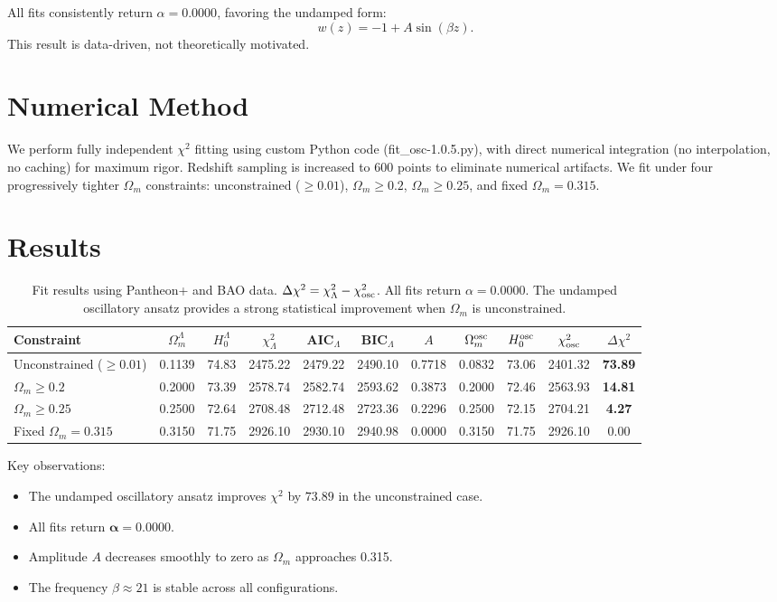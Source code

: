 \documentclass[10pt,a4paper,twocolumn]{article}
\begin{document}
All fits consistently return $\alpha=0.0000$, favoring the undamped form:
\[
w(z) = -1 + A\sin(\beta z).
\]
This result is data-driven, not theoretically motivated.

\section{Numerical Method}
We perform fully independent $\chi^2$ fitting using custom Python code (fit\_osc-1.0.5.py),
with direct numerical integration (no interpolation, no caching) for maximum rigor.
Redshift sampling is increased to 600 points to eliminate numerical artifacts.
We fit under four progressively tighter $\Omega_m$ constraints:
unconstrained ($\ge0.01$), $\Omega_m\ge0.2$, $\Omega_m\ge0.25$, and fixed $\Omega_m=0.315$.

\section{Results}
\begin{table}[ht]
\centering
\caption{Fit results using Pantheon+ and BAO data. $\Delta\chi^2 = \chi^2_{\Lambda} - \chi^2_{\rm osc}$.
All fits return $\alpha=0.0000$. The undamped oscillatory ansatz provides a strong statistical improvement
when $\Omega_m$ is unconstrained.}
\label{tab:results}
\begin{tabular}{lcccccccccc}
\toprule
Constraint & $\Omega_m^\Lambda$ & $H_0^\Lambda$ & $\chi^2_\Lambda$ & AIC$_\Lambda$ & BIC$_\Lambda$ & $A$ & $\Omega_m^{\rm osc}$ & $H_0^{\rm osc}$ & $\chi^2_{\rm osc}$ & $\Delta\chi^2$ \\
\midrule
Unconstrained ($\ge0.01$) & 0.1139 & 74.83 & 2475.22 & 2479.22 & 2490.10 & 0.7718 & 0.0832 & 73.06 & 2401.32 & \textbf{73.89} \\
$\Omega_m\ge0.2$         & 0.2000 & 73.39 & 2578.74 & 2582.74 & 2593.62 & 0.3873 & 0.2000 & 72.46 & 2563.93 & \textbf{14.81} \\
$\Omega_m\ge0.25$        & 0.2500 & 72.64 & 2708.48 & 2712.48 & 2723.36 & 0.2296 & 0.2500 & 72.15 & 2704.21 & \textbf{4.27}  \\
Fixed $\Omega_m=0.315$   & 0.3150 & 71.75 & 2926.10 & 2930.10 & 2940.98 & 0.0000 & 0.3150 & 71.75 & 2926.10 & 0.00    \\
\bottomrule
\end{tabular}
\end{table}

Key observations:
\begin{itemize}
    \item The undamped oscillatory ansatz improves $\chi^2$ by $\mathbf{73.89}$ in the unconstrained case.
    \item All fits return $\mathbf{\alpha=0.0000}$.
    \item Amplitude $A$ decreases smoothly to zero as $\Omega_m$ approaches 0.315.
    \item The frequency $\beta\approx21$ is stable across all configurations.
\end{itemize}
\end{document}
